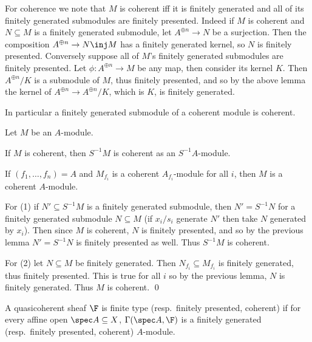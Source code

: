 \eproof

For coherence we note that $M$ is coherent iff it is finitely generated and all of its finitely generated submodules are finitely presented.
Indeed if $M$ is coherent and $N\subseteq M$ is a finitely generated submodule, let $A^{\oplus n}\to N$ be a surjection.
Then the composition $A^{\oplus n}\to N\inj M$ has a finitely generated kernel, so $N$ is finitely presented.
Conversely suppose all of $M$'s finitely generated submodules are finitely presented.
Let $\phi\colon A^{\oplus n}\to M$ be any map, then consider its kernel $K$.
Then $A^{\oplus n}/K$ is a submodule of $M$, thus finitely presented, and so by the above lemma the kernel of $A^{\oplus n}\to A^{\oplus n}/K$, which is $K$, is finitely generated.

In particular a finitely generated submodule of a coherent module is coherent.

\blemm

    Let $M$ be an $A$-module.
    \benum
        \item If $M$ is coherent, then $S^{-1}M$ is coherent as an $S^{-1}A$-module.
        \item If $(f_1,\dots,f_n)=A$ and $M_{f_i}$ is a coherent $A_{f_i}$-module for all $i$, then $M$ is a coherent $A$-module.
    \eenum

\elemm

\bproof

    For (1) if $N'\subseteq S^{-1}M$ is a finitely generated submodule, then $N'=S^{-1}N$ for a finitely generated submodule $N\subseteq M$ (if $x_i/s_i$ generate $N'$
    then take $N$ generated by $x_i$).
    Then since $M$ is coherent, $N$ is finitely presented, and so by the previous lemma $N'=S^{-1}N$ is finitely presented as well.
    Thus $S^{-1}M$ is coherent.

    For (2) let $N\subseteq M$ be finitely generated.
    Then $N_{f_i}\subseteq M_{f_i}$ is finitely generated, thus finitely presented.
    This is true for all $i$ so by the previous lemma, $N$ is finitely generated.
    Thus $M$ is coherent.
    \qed

\eproof

\bdefn

    A quasicoherent sheaf $\F$ is {\emphcolor finite type} (resp.\ {\emphcolor finitely presented}, {\emphcolor coherent}) if for every affine open $\spec A\subseteq X$,
    $\Gamma(\spec A,\F)$ is a finitely generated (resp.\ finitely presented, coherent) $A$-module.

\edefn

